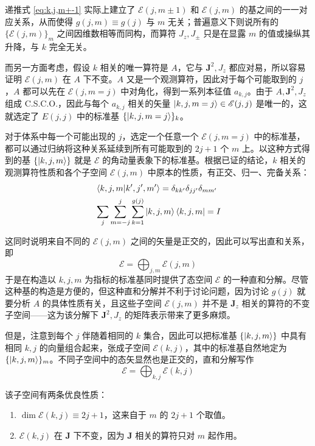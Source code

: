 \documentclass[cn,10pt,math=newtx,citestyle=gb7714-2015,bibstyle=gb7714-2015]{elegantbook}
\def\bm{\boldsymbol}
\def\ms{\mathscr}
\begin{document}
    递推式 \ref{eq:k,j,m+-1} 实际上建立了 $\ms E(j,m\pm 1)$ 和 $\ms E(j,m)$ 的基之间的一一对应关系，从而使得 $g(j,m)\equiv g(j)$ 与 $m$ 无关；普遍意义下则说所有的 $\{\ms E(j,m)\}_m$ 之间因维数相等而同构，而算符 $J_z,J_\pm$ 只是在显露 $m$ 的值或操纵其升降，与 $k$ 完全无关。
    
    而另一方面考虑，假设 $k$ 相关的唯一算符是 $A$，它与 $\bm J^2,J_z$ 都应对易，所以容易证明 $\ms E(j,m)$ 在 $A$ 下不变。$A$ 又是一个观测算符，因此对于每个可能取到的 $j$，$A$ 都可以先在 $\ms E(j,m=j)$ 中对角化，得到一系列本征值 $a_{k,j}$。由于 $A,\bm J^2,J_z$ 组成 C.S.C.O.，因此与每个 $a_{k,j}$ 相关的矢量 $\ket{k,j,m=j}\in\ms E(j,j)$ 是唯一的，这就选定了 $E(j,j)$ 中的标准基 $\{\ket{k,j,m=j}\}_k$。
    
    对于体系中每一个可能出现的 $j$，选定一个任意一个 $\ms E(j,m=j)$ 中的标准基，都可以通过归纳将这种关系延续到所有可能取到的 $2j+1$ 个 $m$ 上。以这种方式得到的基 $\{\ket{k,j,m}\}$ 就是 $\ms E$ 的角动量表象下的标准基。根据已证的结论，$k$ 相关的观测算符性质和各个子空间 $\ms E(j,m)$ 中原本的性质，有正交、归一、完备关系：
    \begin{align}
        &\braket{k,j,m|k',j',m'} = \delta_{kk'}\delta_{jj'}\delta_{mm'}\\
        &\sum_j\sum_{m=-j}^{j}\sum_{k=1}^{g(j)}\ket{k,j,m}\bra{k,j,m} = I
    \end{align}
    
    这同时说明来自不同的 $\ms E(j,m)$ 之间的矢量是正交的，因此可以写出直和关系，即
    \begin{equation}
        \ms E=\bigoplus_{j,m} \ms E(j,m)
    \end{equation}
    于是在构造以 $k,j,m$ 为指标的标准基同时提供了态空间 $\ms E$ 的一种直和分解。尽管这种基的构造是方便的，但这种直和分解并不利于讨论问题，因为讨论 $g(j)$ 就要分析 $A$ 的具体性质有关，且这些子空间 $\ms E(j,m)$ 并不是 $\bm J_z$ 相关的算符的不变子空间——这为该分解下 $\bm J^2,J_z$ 的矩阵表示带来了更多麻烦。
    
    但是，注意到每个 $j$ 伴随着相同的 $k$ 集合，因此可以把标准基 $\{\ket{k,j,m}\}$ 中具有相同 $k,j$ 的向量组合起来，张成子空间 $\ms E(k,j)$，其中的标准基自然地定为 $\{\ket{k,j,m}\}_m$。不同子空间中的态矢显然也是正交的，直和分解写作
    \begin{equation}
        \ms E=\bigoplus_{k,j} \ms E(k,j)
    \end{equation}
    
    该子空间有两条优良性质：
    \begin{enumerate}
        \item $\dim\ms E(k,j)\equiv2j+1$，这来自于 $m$ 的 $2j+1$ 个取值。
        \item $\ms E(k,j)$ 在 $\bm J$ 下不变，因为 $\bm J$ 相关的算符只对 $m$ 起作用。
    \end{enumerate}
    
\end{document}

